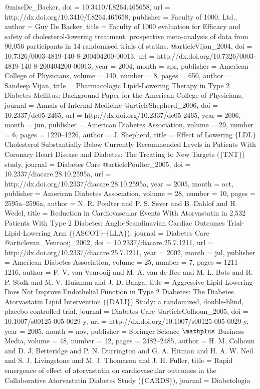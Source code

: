 @misc{De_Backer,
	doi = {10.3410/f.8264.465658},
	url = {http://dx.doi.org/10.3410/f.8264.465658},
	publisher = {Faculty of 1000, Ltd.},
	author = {Guy De Backer},
	title = {Faculty of 1000 evaluation for Efficacy and safety of cholesterol-lowering treatment: prospective meta-analysis of data from 90,056 participants in 14 randomised trials of statins.}
}
@article{Vijan_2004,
	doi = {10.7326/0003-4819-140-8-200404200-00013},
	url = {http://dx.doi.org/10.7326/0003-4819-140-8-200404200-00013},
	year = 2004,
	month = {apr},
	publisher = {American College of Physicians},
	volume = {140},
	number = {8},
	pages = {650},
	author = {Sandeep Vijan},
	title = {Pharmacologic Lipid-Lowering Therapy in Type 2 Diabetes Mellitus: Background Paper for the American College of Physicians},
	journal = {Annals of Internal Medicine}
}
@article{Shepherd_2006,
	doi = {10.2337/dc05-2465},
	url = {http://dx.doi.org/10.2337/dc05-2465},
	year = 2006,
	month = {jun},
	publisher = {American Diabetes Association},
	volume = {29},
	number = {6},
	pages = {1220--1226},
	author = {J. Shepherd},
	title = {Effect of Lowering $\lbrace$LDL$\rbrace$ Cholesterol Substantially Below Currently Recommended Levels in Patients With Coronary Heart Disease and Diabetes: The Treating to New Targets ($\lbrace$TNT$\rbrace$) study},
	journal = {Diabetes Care}
}
@article{Poulter_2005,
	doi = {10.2337/diacare.28.10.2595a},
	url = {http://dx.doi.org/10.2337/diacare.28.10.2595a},
	year = 2005,
	month = {oct},
	publisher = {American Diabetes Association},
	volume = {28},
	number = {10},
	pages = {2595a--2596a},
	author = {N. R. Poulter and P. S. Sever and B. Dahlof and H. Wedel},
	title = {Reduction in Cardiovascular Events With Atorvastatin in 2,532 Patients With Type 2 Diabetes: Anglo-Scandinavian Cardiac Outcomes Trial-Lipid-Lowering Arm ($\lbrace$ASCOT$\rbrace$-$\lbrace$LLA$\rbrace$)},
	journal = {Diabetes Care}
}
@article{van_Venrooij_2002,
	doi = {10.2337/diacare.25.7.1211},
	url = {http://dx.doi.org/10.2337/diacare.25.7.1211},
	year = 2002,
	month = {jul},
	publisher = {American Diabetes Association},
	volume = {25},
	number = {7},
	pages = {1211--1216},
	author = {F. V. van Venrooij and M. A. van de Ree and M. L. Bots and R. P. Stolk and M. V. Huisman and J. D. Banga},
	title = {Aggressive Lipid Lowering Does Not Improve Endothelial Function in Type 2 Diabetes: The Diabetes Atorvastatin Lipid Intervention ($\lbrace$DALI$\rbrace$) Study: a randomized, double-blind, placebo-controlled trial},
	journal = {Diabetes Care}
}
@article{Colhoun_2005,
	doi = {10.1007/s00125-005-0029-y},
	url = {http://dx.doi.org/10.1007/s00125-005-0029-y},
	year = 2005,
	month = {nov},
	publisher = {Springer Science $\mathplus$ Business Media},
	volume = {48},
	number = {12},
	pages = {2482--2485},
	author = {H. M. Colhoun and D. J. Betteridge and P. N. Durrington and G. A. Hitman and H. A. W. Neil and S. J. Livingstone and M. J. Thomason and J. H. Fuller},
	title = {Rapid emergence of effect of atorvastatin on cardiovascular outcomes in the Collaborative Atorvastatin Diabetes Study ($\lbrace$CARDS$\rbrace$)},
	journal = {Diabetologia}
}
